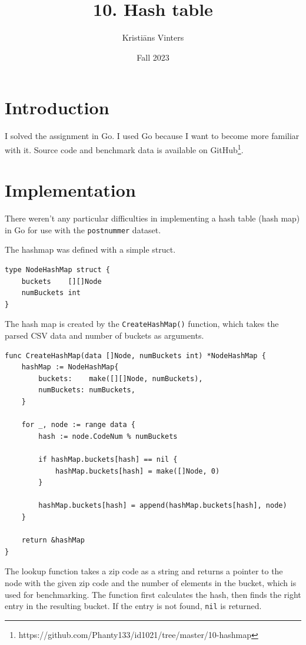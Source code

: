 \documentclass[a4paper,11pt]{article}
\title{\textbf{10. Hash table}}
\author{Kristiāns Vinters}
\date{Fall 2023}
\begin{document}
    \maketitle
    \section*{Introduction}

    I solved the assignment in Go. I used Go because I want to become more familiar with it. Source code and benchmark data is available on GitHub\footnote[1]{https://github.com/Phanty133/id1021/tree/master/10-hashmap}.

    \section*{Implementation}

    There weren't any particular difficulties in implementing a hash table (hash map) in Go for use with the \texttt{postnummer} dataset.

    The hashmap was defined with a simple struct.

    \begin{verbatim}
type NodeHashMap struct {
    buckets    [][]Node
    numBuckets int
}
    \end{verbatim}

    The hash map is created by the \texttt{CreateHashMap()} function, which takes the parsed CSV data and number of buckets as arguments.

    \begin{verbatim}
func CreateHashMap(data []Node, numBuckets int) *NodeHashMap {
    hashMap := NodeHashMap{
        buckets:    make([][]Node, numBuckets),
        numBuckets: numBuckets,
    }

    for _, node := range data {
        hash := node.CodeNum % numBuckets

        if hashMap.buckets[hash] == nil {
            hashMap.buckets[hash] = make([]Node, 0)
        }

        hashMap.buckets[hash] = append(hashMap.buckets[hash], node)
    }

    return &hashMap
}
    \end{verbatim}

    The lookup function takes a zip code as a string and returns a pointer to the node with the given zip code and the number of elements in the bucket, which is used for benchmarking. The function first calculates the hash, then finds the right entry in the resulting bucket. If the entry is not found, \texttt{nil} is returned.
\end{document}
